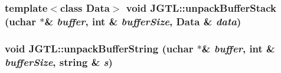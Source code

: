 \hypertarget{namespace_j_g_t_l_c6ee2959d8b1b74adf7177c3066513a0}{
\subsubsection[unpackBufferStack]{\setlength{\rightskip}{0pt plus 5cm}template$<$class Data$>$ void JGTL::unpack\-Buffer\-Stack (uchar $\ast$\& {\em buffer}, int \& {\em buffer\-Size}, Data \& {\em data})}}
\label{namespace_j_g_t_l_c6ee2959d8b1b74adf7177c3066513a0}


\hypertarget{namespace_j_g_t_l_34dd4000293ca4b9c6fff41b43614e3c}{
\subsubsection[unpackBufferString]{\setlength{\rightskip}{0pt plus 5cm}void JGTL::unpack\-Buffer\-String (uchar $\ast$\& {\em buffer}, int \& {\em buffer\-Size}, string \& {\em s})}}
\label{namespace_j_g_t_l_34dd4000293ca4b9c6fff41b43614e3c}


